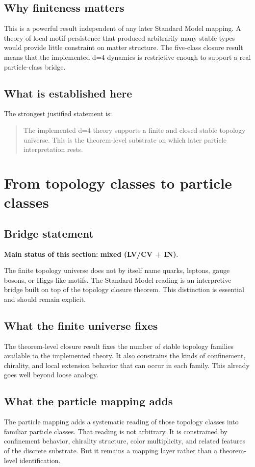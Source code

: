\documentclass[11pt]{article}
\begin{document}
\subsection{Why finiteness matters}
This is a powerful result independent of any later Standard Model mapping. A theory of local motif persistence that produced arbitrarily many stable types would provide little constraint on matter structure. The five-class closure result means that the implemented d=4 dynamics is restrictive enough to support a real particle-class bridge.

\subsection{What is established here}
The strongest justified statement is:
\begin{quote}
The implemented d=4 theory supports a finite and closed stable topology universe. This is the theorem-level substrate on which later particle interpretation rests.
\end{quote}

\section{From topology classes to particle classes}\label{sec:topology-to-particles}
\subsection{Bridge statement}
\textbf{Main status of this section:} \textbf{mixed (LV/CV + IN)}.

The finite topology universe does not by itself name quarks, leptons, gauge bosons, or Higgs-like motifs. The Standard Model reading is an interpretive bridge built on top of the topology closure theorem. This distinction is essential and should remain explicit.

\subsection{What the finite universe fixes}
The theorem-level closure result fixes the number of stable topology families available to the implemented theory. It also constrains the kinds of confinement, chirality, and local extension behavior that can occur in each family. This already goes well beyond loose analogy.

\subsection{What the particle mapping adds}
The particle mapping adds a systematic reading of those topology classes into familiar particle classes. That reading is not arbitrary. It is constrained by confinement behavior, chirality structure, color multiplicity, and related features of the discrete substrate. But it remains a mapping layer rather than a theorem-level identification.
\end{document}
